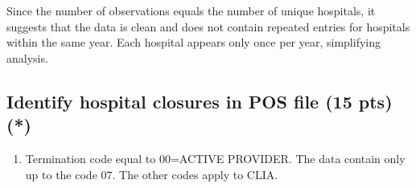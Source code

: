 \documentclass[
  letterpaper,
  DIV=11,
  numbers=noendperiod]{scrartcl}
\providecommand{\tightlist}{%
  \setlength{\itemsep}{0pt}\setlength{\parskip}{0pt}}\usepackage{longtable,booktabs,array}
\begin{document}
Since the number of observations equals the number of unique hospitals,
it suggests that the data is clean and does not contain repeated entries
for hospitals within the same year. Each hospital appears only once per
year, simplifying analysis.

\subsection{Identify hospital closures in POS file (15 pts)
(*)}\label{identify-hospital-closures-in-pos-file-15-pts}

\begin{enumerate}
\def\labelenumi{\arabic{enumi}.}
\tightlist
\item
  Termination code equal to 00=ACTIVE PROVIDER. The data contain only up
  to the code 07. The other codes apply to CLIA.
\end{enumerate}
\end{document}
